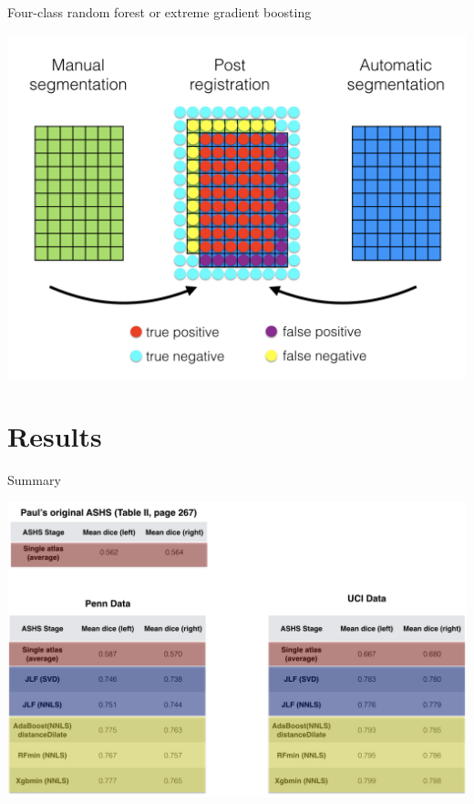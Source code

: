 \documentclass[ignorenonframetext,]{beamer}
\begin{document}
\begin{frame}{Four-class random forest or extreme gradient boosting}

\centering
\includegraphics[width=0.85 \textwidth]{../Figures/correctiveLearning003.png}

\end{frame}

\section{Results}\label{results}

\begin{frame}{Summary}

\centering
\includegraphics[width=0.85 \textwidth]{../Figures/summaryResults.png}

\end{frame}
\end{document}
